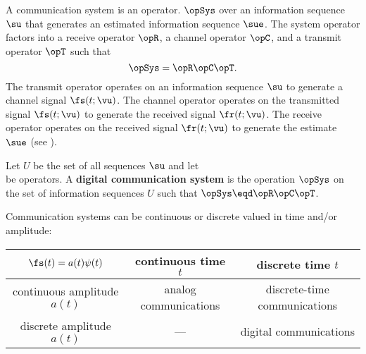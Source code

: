 A communication system is an operator.
$\opSys$ over an information sequence $\su$ that generates an
estimated information sequence $\sue$.
The system operator factors into a
receive operator $\opR$, a channel operator $\opC$, and
a transmit operator $\opT$ such that
   \[ \opSys = \opR\opC\opT. \]
The transmit operator
operates on an information sequence $\su$ to generate
a channel signal $\fs(t;\vu)$.
The channel operator operates on the transmitted signal $\fs(t;\vu)$
to generate the received signal $\fr(t;\vu)$.
The receive operator operates on the received signal $\fr(t;\vu)$
to generate the estimate $\sue$
(see ).


\begin{definition}
\label{def:comsys}
Let $U$ be the set of all sequences $\su$ and let
\\
be operators.
A {\bf digital communication system} is the operation $\opSys$
on the set of information sequences $U$ such that
$\opSys \eqd \opR\opC\opT$.
\end{definition}

Communication systems can be continuous or discrete valued in
time and/or amplitude:

\begin{center}
   \begin{tabular}{|c||c|c|}
      \hline
         $\fs(t)=a(t)\psi(t)$   &  continuous time $t$      & discrete time $t$   \\
      \hline
      \hline
         continuous amplitude $a(t)$ & analog communications   & discrete-time communications  \\
      \hline
         discrete amplitude $a(t)$   &---                    & digital communications \\
      \hline
   \end{tabular}
\end{center}

